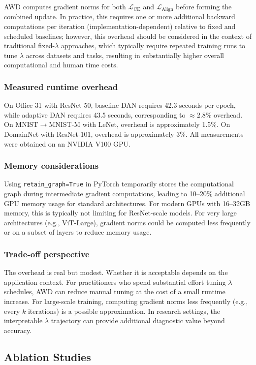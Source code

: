 \documentclass[pdflatex,sn-mathphys-num]{sn-jnl}
\theoremstyle{thmstyleone}
\theoremstyle{thmstyletwo}
\theoremstyle{thmstylethree}
\begin{document}
AWD computes gradient norms for both $\mathcal{L}_{\text{CE}}$ and $\mathcal{L}_{\text{Align}}$ before forming the combined update.
In practice, this requires one or more additional backward computations per iteration (implementation-dependent) relative to fixed and scheduled baselines; however, this overhead should be considered in the context of traditional fixed-$\lambda$ approaches, which typically require repeated training runs to tune $\lambda$ across datasets and tasks, resulting in substantially higher overall computational and human time costs.

\subsubsection{Measured runtime overhead}
On Office-31 with ResNet-50, baseline DAN requires 42.3 seconds per epoch, while adaptive DAN requires 43.5 seconds, corresponding to $\approx2.8\%$ overhead.
On MNIST$\to$MNIST-M with LeNet, overhead is approximately 1.5\%.
On DomainNet with ResNet-101, overhead is approximately 3\%.
All measurements were obtained on an NVIDIA V100 GPU.

\subsubsection{Memory considerations}
Using \texttt{retain\_graph=True} in PyTorch temporarily stores the computational graph during intermediate gradient computations, leading to 10--20\% additional GPU memory usage for standard architectures.
For modern GPUs with 16--32GB memory, this is typically not limiting for ResNet-scale models.
For very large architectures (e.g., ViT-Large), gradient norms could be computed less frequently or on a subset of layers to reduce memory usage.

\subsubsection{Trade-off perspective}
The overhead is real but modest. Whether it is acceptable depends on the application context.
For practitioners who spend substantial effort tuning $\lambda$ schedules, AWD can reduce manual tuning at the cost of a small runtime increase.
For large-scale training, computing gradient norms less frequently (e.g., every $k$ iterations) is a possible approximation.
In research settings, the interpretable $\lambda$ trajectory can provide additional diagnostic value beyond accuracy.

\subsection{Ablation Studies}
\label{sec:ablation}
\end{document}
